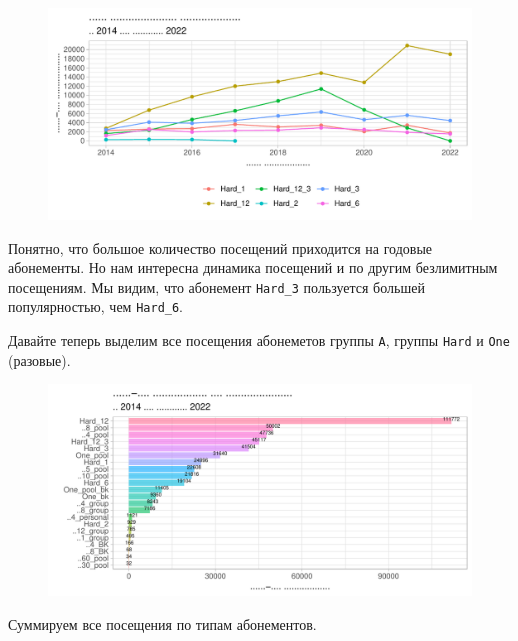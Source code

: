 \documentclass[
  letterpaper,
  DIV=11,
  numbers=noendperiod]{scrreprt}
\begin{document}
\begin{figure}

{\centering \includegraphics{./intro_files/figure-pdf/unnamed-chunk-14-1.pdf}

}

\end{figure}

Понятно, что большое количество посещений приходится на годовые
абонементы. Но нам интересна динамика посещений и по другим безлимитным
посещениям. Мы видим, что абонемент \texttt{Hard\_3} пользуется большей
популярностью, чем \texttt{Hard\_6}.

Давайте теперь выделим все посещения абонеметов группы \texttt{А},
группы \texttt{Hard} и \texttt{One} (разовые).

\begin{figure}

{\centering \includegraphics{./intro_files/figure-pdf/unnamed-chunk-15-1.pdf}

}

\end{figure}

Суммируем все посещения по типам абонементов.
\end{document}
